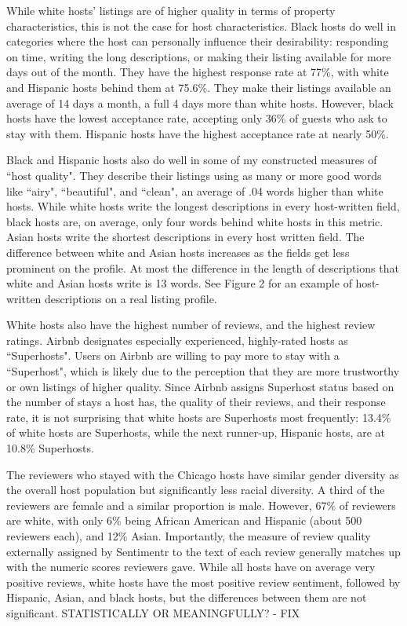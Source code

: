 While white hosts' listings are of higher quality in terms of property characteristics, this is not the case for host characteristics. Black hosts do well in categories where the host can personally influence their desirability: responding on time, writing the long descriptions, or making their listing available for more days out of the month. They have the highest response rate at 77\%, with white and Hispanic hosts behind them at 75.6\%. They make their listings available an average of 14 days a month, a full 4 days more than white hosts. However, black hosts have the lowest acceptance rate, accepting only 36\% of guests who ask to stay with them. Hispanic hosts have the highest acceptance rate at nearly 50\%. 

Black and Hispanic hosts also do well in some of my constructed measures of ``host quality". They describe their listings using as many or more good words like ``airy", ``beautiful", and ``clean", an average of .04 words higher than white hosts. While white hosts write the longest descriptions in every host-written field, black hosts are, on average, only four words behind white hosts in this metric. Asian hosts write the shortest descriptions in every host written field. The difference between white and Asian hosts increases as the fields get less prominent on the profile. At most the difference in the length of descriptions that white and Asian hosts write is 13 words. See Figure 2 for an example of host-written descriptions on a real listing profile. 

White hosts also have the highest number of reviews, and the highest review ratings. Airbnb designates especially experienced, highly-rated hosts as ``Superhosts". Users on Airbnb are willing to pay more to stay with a ``Superhost", which is likely due to the perception that they are more trustworthy or own listings of higher quality. Since Airbnb assigns Superhost status based on the number of stays a host has, the quality of their reviews, and their response rate, it is not surprising that white hosts are Superhosts most frequently: 13.4\% of white hosts are Superhosts, while the next runner-up, Hispanic hosts, are at 10.8\% Superhosts.

The reviewers who stayed with the Chicago hosts have similar gender diversity as the overall host population but significantly less racial diversity. A third of the reviewers are female and a similar proportion is male. However, 67\% of reviewers are white, with only 6\% being African American and Hispanic (about 500 reviewers each), and 12\% Asian. Importantly, the measure of review quality externally assigned by Sentimentr to the text of each review generally matches up with the numeric scores reviewers gave. While all hosts have on average very positive reviews, white hosts have the most positive review sentiment, followed by Hispanic, Asian, and black hosts, but the differences between them are not significant. STATISTICALLY OR MEANINGFULLY? - FIX

